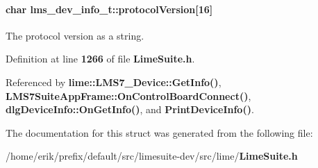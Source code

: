 \paragraph[{protocol\+Version}]{\setlength{\rightskip}{0pt plus 5cm}char lms\+\_\+dev\+\_\+info\+\_\+t\+::protocol\+Version[16]}\label{structlms__dev__info__t_ae79f5bece5767d5ca756c9aec8b4c8fa}


The protocol version as a string. 



Definition at line {\bf 1266} of file {\bf Lime\+Suite.\+h}.



Referenced by {\bf lime\+::\+L\+M\+S7\+\_\+\+Device\+::\+Get\+Info()}, {\bf L\+M\+S7\+Suite\+App\+Frame\+::\+On\+Control\+Board\+Connect()}, {\bf dlg\+Device\+Info\+::\+On\+Get\+Info()}, and {\bf Print\+Device\+Info()}.



The documentation for this struct was generated from the following file\+:\begin{DoxyCompactItemize}
\item 
/home/erik/prefix/default/src/limesuite-\/dev/src/lime/{\bf Lime\+Suite.\+h}\end{DoxyCompactItemize}
